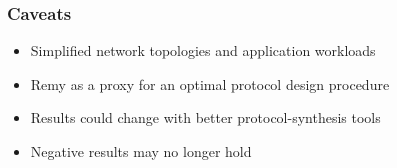 \begin{frame}
\frametitle{Caveats}
\begin{itemize}
\item<1-> Simplified network topologies and application workloads
\item<2-> Remy as a proxy for an optimal protocol design procedure
\item<3-> Results could change with better protocol-synthesis tools
\item<4-> Negative results may no longer hold
\end{itemize}
\end{frame}
